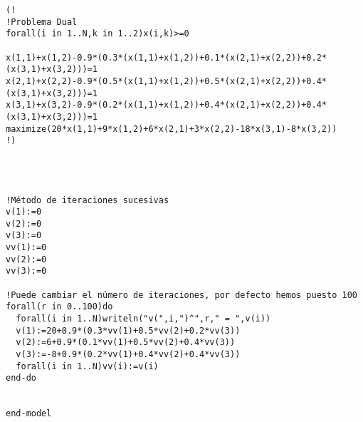 \documentclass[twoside]{article}
\begin{document}
\begin{ejercicio}{3}
\begin{solucion}
\begin{verbatim}
(!
!Problema Dual
forall(i in 1..N,k in 1..2)x(i,k)>=0

x(1,1)+x(1,2)-0.9*(0.3*(x(1,1)+x(1,2))+0.1*(x(2,1)+x(2,2))+0.2*(x(3,1)+x(3,2)))=1
x(2,1)+x(2,2)-0.9*(0.5*(x(1,1)+x(1,2))+0.5*(x(2,1)+x(2,2))+0.4*(x(3,1)+x(3,2)))=1
x(3,1)+x(3,2)-0.9*(0.2*(x(1,1)+x(1,2))+0.4*(x(2,1)+x(2,2))+0.4*(x(3,1)+x(3,2)))=1
maximize(20*x(1,1)+9*x(1,2)+6*x(2,1)+3*x(2,2)-18*x(3,1)-8*x(3,2))
!)




!Método de iteraciones sucesivas
v(1):=0
v(2):=0
v(3):=0
vv(1):=0
vv(2):=0
vv(3):=0

!Puede cambiar el número de iteraciones, por defecto hemos puesto 100
forall(r in 0..100)do
  forall(i in 1..N)writeln("v(",i,")^",r," = ",v(i))
  v(1):=20+0.9*(0.3*vv(1)+0.5*vv(2)+0.2*vv(3))
  v(2):=6+0.9*(0.1*vv(1)+0.5*vv(2)+0.4*vv(3))
  v(3):=-8+0.9*(0.2*vv(1)+0.4*vv(2)+0.4*vv(3))
  forall(i in 1..N)vv(i):=v(i)
end-do


end-model
\end{verbatim}

\end{solucion}
\end{ejercicio}
\end{document}
